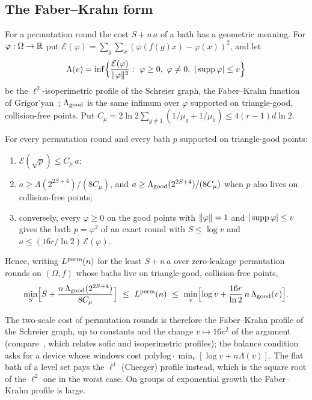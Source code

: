 \subsection{The Faber--Krahn form}

For a permutation round the cost $S+n\,a$ of a bath has a geometric meaning. For $\varphi:\Omega\to\mathbb R$ put
$\mathcal E(\varphi)=\sum_g\sum_x(\varphi(f(g)x)-\varphi(x))^2$, and let
\[
\Lambda(v)=\inf\Bigl\{\frac{\mathcal E(\varphi)}{\nrm\varphi^2}:\ \varphi\ge0,\ \varphi\ne0,\ |\supp\varphi|\le v\Bigr\}
\]
be the $\ell^2$-isoperimetric profile of the Schreier graph, the Faber--Krahn function of Grigor'yan~\cite{Grigoryan1994}; $\Lambda_{\rm good}$ is the same
infimum over $\varphi$ supported on triangle-good, collision-free points. Put $C_\mu=2\ln2\sum_{g\ne1}(1/\mu_g+1/\mu_1)\le4(r-1)d\ln2$.

\begin{theorem}\label{thm:FK}
For every permutation round and every bath $p$ supported on triangle-good points:
\begin{enumerate}[label=(\roman*),itemsep=1pt]
\item $\mathcal E(\sqrt p)\le C_\mu\,a$;
\item $a\ge\Lambda(2^{2S+4})/(8C_\mu)$, and $a\ge\Lambda_{\rm good}(2^{2S+4})/(8C_\mu)$ when $p$ also lives on collision-free points;
\item conversely, every $\varphi\ge0$ on the good points with $\lVert \varphi\rVert=1$ and $|\operatorname{supp}\varphi|\le v$ gives the bath $p=\varphi^2$ of an exact round with
$S\le\log v$ and $a\le(16r/\ln2)\,\mathcal E(\varphi)$.
\end{enumerate}
Hence, writing $L^{\rm perm}(n)$ for the least $S+n\,a$ over zero-leakage permutation rounds on $(\Omega,f)$ whose baths live on triangle-good,
collision-free points,
\[
\min_S\Bigl[S+\frac{n\,\Lambda_{\rm good}(2^{2S+4})}{8C_\mu}\Bigr]\ \le\ L^{\rm perm}(n)\ \le\ \min_v\Bigl[\log v+\frac{16r}{\ln2}\,n\,\Lambda_{\rm good}(v)\Bigr].
\]
\end{theorem}

The two-scale cost of permutation rounds is therefore the Faber--Krahn profile of the Schreier graph, up to constants and the change $v\mapsto16v^2$ of
the argument (compare~\cite[Proposition~3.14]{Cornulier2013}, which relates sofic and isoperimetric profiles); the balance condition asks for a device whose windows cost $\mathrm{polylog}\cdot\min_v[\log v+n\Lambda(v)]$. The flat bath of a level
set pays the $\ell^1$ (Cheeger) profile instead, which is the square root of the $\ell^2$ one in the worst case. On groups of exponential growth the
Faber--Krahn profile is large.

